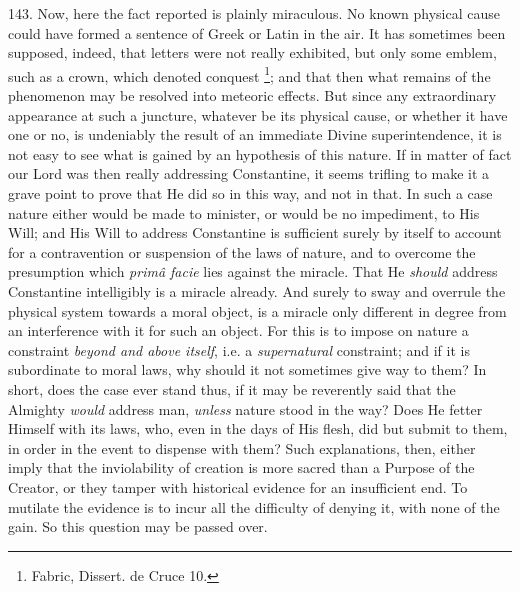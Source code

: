 143.
Now, here the fact reported is plainly miraculous. No known physical
cause could have formed a sentence of Greek or Latin in the air. It
has sometimes been supposed, indeed, that letters were not
really exhibited, but only some emblem, such as a crown, which denoted
conquest \footnote{Fabric, Dissert. de Cruce 10.}; and that then
what remains of the phenomenon may be resolved into meteoric effects.
But since any extraordinary appearance at such a juncture, whatever be
its physical cause, or whether it have one or no, is undeniably the
result of an immediate Divine superintendence, it is not easy to see
what is gained by an hypothesis of this nature. If in matter of fact
our Lord was then really addressing Constantine, it seems trifling to
make it a grave point to prove that He did so in this way, and not in
that. In such a case nature either would be made to minister, or would
be no impediment, to His Will; and His Will to address Constantine is
sufficient surely by itself to account for a contravention or
suspension of the laws of nature, and to overcome the presumption
which \emph{primâ facie} lies against the miracle. That He \emph{should}
address Constantine intelligibly is a miracle already. And surely to
sway and overrule the physical system towards a moral object, is a
miracle only different in degree from an interference with it for such
an object. For this is to impose on nature a constraint \emph{beyond and
above itself}, i.e. a \emph{supernatural} constraint; and if it is
subordinate to moral laws, why should it not sometimes give way to
them? In short, does the case ever stand thus, if it may be
reverently said that the Almighty \emph{would} address man, \emph{unless}
nature stood in the way? Does He fetter Himself with its laws, who,
even in the days of His flesh, did but submit to them, in order in the
event to dispense with them? Such explanations, then, either imply
that the inviolability of creation is more sacred than a Purpose of
the Creator, or they tamper with historical evidence for an
insufficient end. To mutilate the evidence is to incur all the
difficulty of denying it, with none of the gain. So this question may
be passed over.

